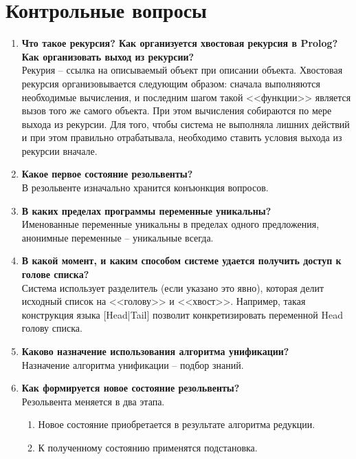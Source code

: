 \chapter{Контрольные вопросы}
\begin{enumerate}
	\item \textbf{Что такое рекурсия? Как организуется хвостовая рекурсия в Prolog? Как организовать выход из рекурсии?} \\
	Рекурия -- ссылка на описываемый объект при описании объекта. Хвостовая рекурсия организовывается следующим образом: сначала выполняются необходимые вычисления, и последним шагом такой <<функции>> является вызов того же самого объекта. При этом вычисления собираются по мере выхода из рекурсии. Для того, чтобы система не выполняла лишних действий и при этом правильно отрабатывала, необходимо ставить условия выхода из рекурсии вначале.
	
	\item \textbf{Какое первое состояние резольвенты?} \\	
	В резольвенте изначально хранится конъюнкция вопросов.
	
	\item \textbf{В каких пределах программы переменные уникальны?} \\
	Именованные переменные уникальны в пределах одного предложения, анонимные переменные -- уникальные всегда.
	
	\item \textbf{В какой момент, и каким способом системе удается получить доступ к голове списка?} \\
	Система использует разделитель (если указано это явно), которая делит исходный список на <<голову>> и <<хвост>>. Например, такая конструкция языка [Head|Tail] позволит конкретизировать переменной Head голову списка.
	
	\item \textbf{Каково назначение использования алгоритма унификации?} \\
	Назначение алгоритма унификации -- подбор знаний.
	
	\item \textbf{Как формируется новое состояние резольвенты?} \\
	Резольвента меняется в два этапа.
	\begin{enumerate}
		\item Новое состояние приобретается в результате алгоритма редукции. 
		\item К полученному состоянию применятся подстановка.
	\end{enumerate}
	

\end{enumerate}
